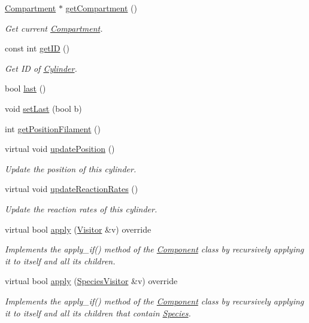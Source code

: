 \begin{DoxyCompactItemize}
\hyperlink{classCompartment}{Compartment} $\ast$ \hyperlink{classCylinder_a09201650224a4612db179266b2ff43b7}{get\+Compartment} ()
\begin{DoxyCompactList}\small\item\em Get current \hyperlink{classCompartment}{Compartment}. \end{DoxyCompactList}\item 
const int \hyperlink{classCylinder_aa571913545eb8c2ccde4cee86fe4af4d}{get\+I\+D} ()
\begin{DoxyCompactList}\small\item\em Get I\+D of \hyperlink{classCylinder}{Cylinder}. \end{DoxyCompactList}\item 
bool \hyperlink{classCylinder_a2dd850edf22c137ecd734ee490741c37}{last} ()
\item 
void \hyperlink{classCylinder_a41b9f84107abb9603038ede14fc33073}{set\+Last} (bool b)
\item 
int \hyperlink{classCylinder_a2516138846ce5fcc29b2a7379e6beae7}{get\+Position\+Filament} ()
\item 
virtual void \hyperlink{classCylinder_aff701d6f4400ab216431d627c54a0b4e}{update\+Position} ()
\begin{DoxyCompactList}\small\item\em Update the position of this cylinder. \end{DoxyCompactList}\item 
virtual void \hyperlink{classCylinder_a1e824345ba2ec690930b34f74cc3badf}{update\+Reaction\+Rates} ()
\begin{DoxyCompactList}\small\item\em Update the reaction rates of this cylinder. \end{DoxyCompactList}\item 
virtual bool \hyperlink{classComposite_a58123ab346f6621a187bebe456e383ea}{apply} (\hyperlink{classVisitor}{Visitor} \&v) override
\begin{DoxyCompactList}\small\item\em Implements the apply\+\_\+if() method of the \hyperlink{classComponent}{Component} class by recursively applying it to itself and all its children. \end{DoxyCompactList}\item 
virtual bool \hyperlink{classComposite_a18937a1f6f84a159e77ba83dd34b2e20}{apply} (\hyperlink{classSpeciesVisitor}{Species\+Visitor} \&v) override
\begin{DoxyCompactList}\small\item\em Implements the apply\+\_\+if() method of the \hyperlink{classComponent}{Component} class by recursively applying it to itself and all its children that contain \hyperlink{classSpecies}{Species}. \end{DoxyCompactList}\item 

\end{DoxyCompactItemize}
